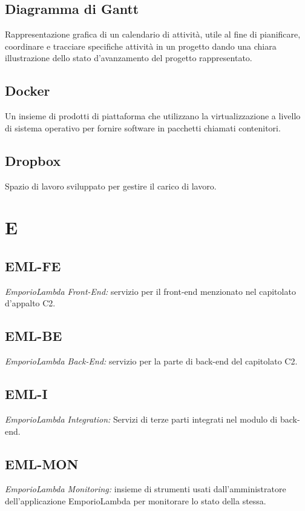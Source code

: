 \subsection*{Diagramma di Gantt}
Rappresentazione grafica di un calendario di attività, utile al fine di pianificare, coordinare e tracciare specifiche attività in un progetto dando una chiara illustrazione dello stato d'avanzamento del progetto rappresentato.

\subsection*{Docker}
Un insieme di prodotti di piattaforma che utilizzano la virtualizzazione a livello di sistema operativo per fornire software in pacchetti chiamati contenitori.

\subsection*{Dropbox}
Spazio di lavoro sviluppato per gestire il carico di lavoro. 

\section*{E}
\subsection*{EML-FE}
\textit{EmporioLambda Front-End:} servizio per il front-end menzionato nel capitolato d'appalto C2.

\subsection*{EML-BE}
\textit{EmporioLambda Back-End:} servizio per la parte di back-end del capitolato C2.

\subsection*{EML-I}
\textit{EmporioLambda Integration:} Servizi di terze parti integrati nel modulo di back-end.

\subsection*{EML-MON}
\textit{EmporioLambda Monitoring:} insieme di strumenti usati dall'amministratore dell'applicazione EmporioLambda per monitorare lo stato della stessa.

